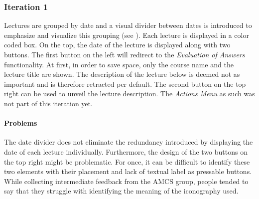 \subsubsection{Iteration 1}
Lectures are grouped by date and a visual divider between dates is introduced to emphasize and visualize this grouping (see ). Each lecture is displayed in a color coded box. On the top, the date of the lecture is displayed along with two buttons. The first button on the left will redirect to the \emph{Evaluation of Answers} functionality. 
At first, in order to save space, only the course name and the lecture title are shown. The description of the lecture below is deemed not as important and is therefore retracted per default. The second button on the top right can be used to unveil the lecture description.
The \emph{Actions Menu} as such was not part of this iteration yet.

\paragraph{Problems}
The date divider does not eliminate the redundancy introduced by displaying the date of each lecture individually.
Furthermore, the design of the two buttons on the top right might be problematic. For once, it can be difficult to identify these two elements with their placement and lack of textual label as pressable buttons. While collecting intermediate feedback from the AMCS group, people tended to say that they struggle with identifying the meaning of the iconography used. 

